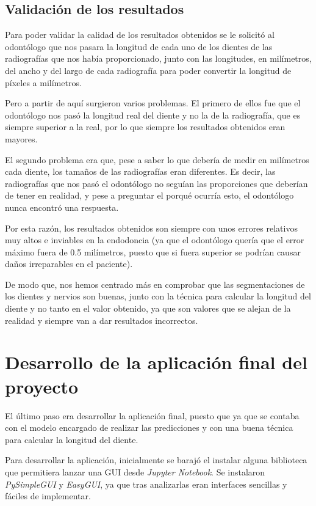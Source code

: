 \subsection{Validación de los resultados}
Para poder validar la calidad de los resultados obtenidos se le solicitó al odontólogo que nos pasara la longitud de cada uno de los dientes de las radiografías que nos había proporcionado, junto con las longitudes, en milímetros, del ancho y del largo de cada radiografía para poder convertir la longitud de píxeles a milímetros. 

Pero a partir de aquí surgieron varios problemas. El primero de ellos fue que el odontólogo nos pasó la longitud real del diente y no la de la radiografía, que es siempre superior a la real, por lo que siempre los resultados obtenidos eran mayores.

El segundo problema era que, pese a saber lo que debería de medir en milímetros cada diente, los tamaños de las radiografías eran diferentes. Es decir, las radiografías que nos pasó el odontólogo no seguían las proporciones que deberían de tener en realidad, y pese a preguntar el porqué ocurría esto, el odontólogo nunca encontró una respuesta.

Por esta razón, los resultados obtenidos son siempre con unos errores relativos muy altos e inviables en la endodoncia (ya que el odontólogo quería que el error máximo fuera de 0.5 milímetros, puesto que si fuera superior se podrían causar daños irreparables en el paciente).

De modo que, nos hemos centrado más en comprobar que las segmentaciones de los dientes y nervios son buenas, junto con la técnica para calcular la longitud del diente y no tanto en el valor obtenido, ya que son valores que se alejan de la realidad y siempre van a dar resultados incorrectos.

\section{Desarrollo de la aplicación final del proyecto}
El último paso era desarrollar la aplicación final, puesto que ya que se contaba con el modelo encargado de realizar las predicciones y con una buena técnica para calcular la longitud del diente.

Para desarrollar la aplicación, inicialmente se barajó el instalar alguna biblioteca que permitiera lanzar una GUI desde \emph{Jupyter Notebook}. Se instalaron \emph{PySimpleGUI} y \emph{EasyGUI}, ya que tras analizarlas eran interfaces sencillas y fáciles de implementar.

